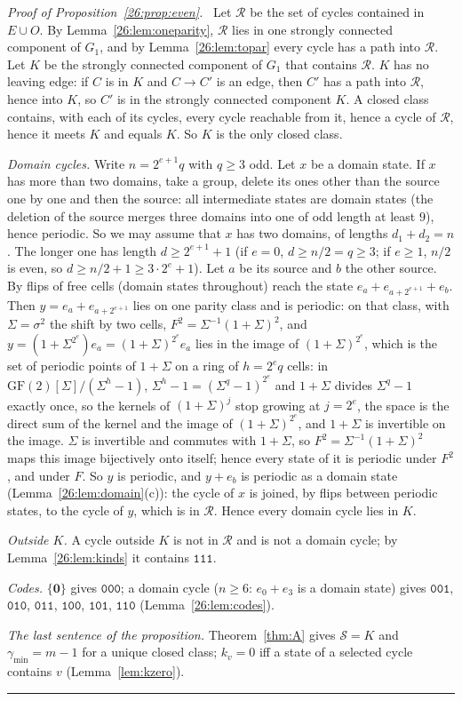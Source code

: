 \documentclass[10pt,a4paper]{article}
\newcommand{\qedmark}{\rule{1.1ex}{1.1ex}}
\newenvironment{proof}[1][Proof]{\par\smallskip\noindent\textit{#1.}\ }{\hfill\qedmark\par\smallskip}
\newcommand{\zero}{\mathbf{0}}                %
\newcommand{\gmin}{\gamma_{\min}}
\newcommand{\Sel}{\mathcal{S}}                %
\newcommand{\Gone}{G_1}                       %
\newcommand{\code}[1]{\mathtt{#1}}            %
\begin{document}
\begin{proof}[Proof of Proposition~\ref{26:prop:even}]
Let $\mathcal{R}$ be the set of cycles contained in $E\cup O$. By Lemma~\ref{26:lem:oneparity}, $\mathcal{R}$ lies
in one strongly connected component of $\Gone$, and by Lemma~\ref{26:lem:topar} every cycle has a path into
$\mathcal{R}$. Let $K$ be the strongly connected component of $\Gone$ that contains $\mathcal{R}$. $K$ has no
leaving edge: if $C$ is in $K$ and $C\to C'$ is an edge, then $C'$ has a path into $\mathcal{R}$, hence into $K$,
so $C'$ is in the strongly connected component $K$. A closed class contains, with each of its cycles, every cycle
reachable from it, hence a cycle of $\mathcal{R}$, hence it meets $K$ and equals $K$. So $K$ is the only closed
class.

\emph{Domain cycles.} Write $n=2^{e+1}q$ with $q\ge3$ odd. Let $x$ be a domain state. If $x$ has more than two
domains, take a group, delete its ones other than the source one by one and then the source: all intermediate
states are domain states (the deletion of the source merges three domains into one of odd length at least $9$),
hence periodic. So we may assume that $x$ has two domains, of lengths $d_1+d_2=n$. The longer one has length
$d\ge2^{e+1}+1$ (if $e=0$, $d\ge n/2=q\ge3$; if $e\ge1$, $n/2$ is even, so $d\ge n/2+1\ge3\cdot2^e+1$). Let $a$ be
its source and $b$ the other source. By flips of free cells (domain states throughout) reach the state
$e_a+e_{a+2^{e+1}}+e_b$. Then $y=e_a+e_{a+2^{e+1}}$ lies on one parity class and is periodic: on that class, with
$\Sigma=\sigma^2$ the shift by two cells, $F^2=\Sigma^{-1}(1+\Sigma)^2$, and
$y=(1+\Sigma^{2^e})e_a=(1+\Sigma)^{2^e}e_a$ lies in the image of $(1+\Sigma)^{2^e}$, which is the set of periodic
points of $1+\Sigma$ on a ring of $h=2^eq$ cells: in $\mathrm{GF}(2)[\Sigma]/(\Sigma^h-1)$,
$\Sigma^h-1=(\Sigma^q-1)^{2^e}$ and $1+\Sigma$ divides $\Sigma^q-1$ exactly once, so the kernels of
$(1+\Sigma)^j$ stop growing at $j=2^e$, the space is the direct sum of the kernel and the image of
$(1+\Sigma)^{2^e}$, and $1+\Sigma$ is invertible on the image. $\Sigma$ is invertible and commutes with
$1+\Sigma$, so $F^2=\Sigma^{-1}(1+\Sigma)^2$ maps this image bijectively onto itself; hence every state of it is
periodic under $F^2$, and under $F$. So $y$ is periodic, and $y+e_b$ is periodic as a domain state (Lemma~\ref{26:lem:domain}(c)): the cycle of $x$ is
joined, by flips between periodic states, to the cycle of $y$, which is in $\mathcal{R}$. Hence every domain cycle
lies in $K$.

\emph{Outside $K$.} A cycle outside $K$ is not in $\mathcal{R}$ and is not a domain cycle; by
Lemma~\ref{26:lem:kinds} it contains $\code{111}$.

\emph{Codes.} $\{\zero\}$ gives $\code{000}$; a domain cycle ($n\ge6$: $e_0+e_3$ is a domain state) gives
$\code{001}$, $\code{010}$, $\code{011}$, $\code{100}$, $\code{101}$, $\code{110}$ (Lemma~\ref{26:lem:codes}).

\emph{The last sentence of the proposition.} Theorem~\ref{thm:A} gives $\Sel=K$ and $\gmin=m-1$ for a unique closed
class; $k_v=0$ iff a state of a selected cycle contains $v$ (Lemma~\ref{lem:kzero}).
\end{proof}
\end{document}
